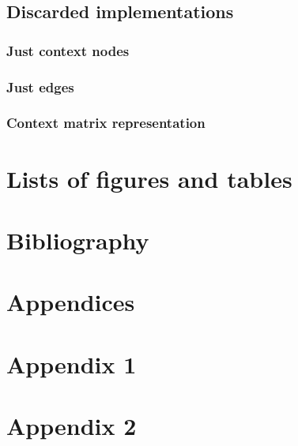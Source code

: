 \documentclass{article}
\begin{document}
 \subsection{Discarded implementations}

  \subsubsection{Just context nodes}
  
  \subsubsection{Just edges}
  
  \subsubsection{Context matrix representation}
 
 \section{Lists of figures and tables}
 
 \newpage
 \listoffigures
 \listoftables
 
 \section{Bibliography} %
 
 \newpage
 
 {}
 
 
 \newpage
 \section{Appendices}
 \begin{appendices}
  \section*{Appendix 1}
  \section*{Appendix 2}
 \end{appendices}
 
 
\end{document}
